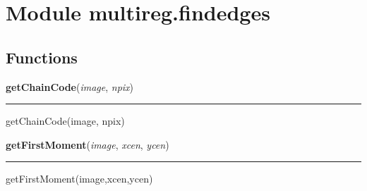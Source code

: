 %
%
%


\section{Module multireg.findedges}

    \label{multireg:findedges}


  \subsection{Functions}

    \label{multireg:findedges:getChainCode}
    \vspace{0.5ex}

    \begin{boxedminipage}{\textwidth}

    \raggedright \textbf{getChainCode}(\textit{image}, \textit{npix})

    \vspace{-1.5ex}

    \rule{\textwidth}{0.5\fboxrule}
    getChainCode(image, npix)

    \vspace{1ex}

    \end{boxedminipage}

    \label{multireg:findedges:getFirstMoment}
    \vspace{0.5ex}

    \begin{boxedminipage}{\textwidth}

    \raggedright \textbf{getFirstMoment}(\textit{image}, \textit{xcen}, \textit{ycen})

    \vspace{-1.5ex}

    \rule{\textwidth}{0.5\fboxrule}
    getFirstMoment(image,xcen,ycen)

    \vspace{1ex}

    \end{boxedminipage}

